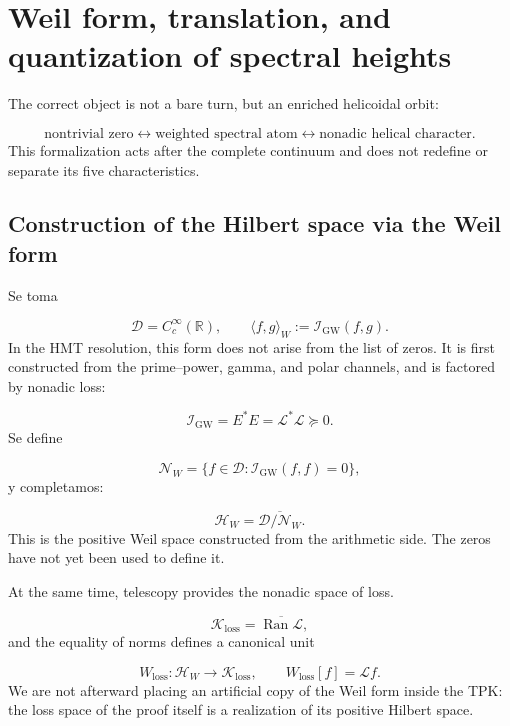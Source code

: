 \section{Weil form, translation, and quantization of spectral heights}
The correct object is not a bare turn, but an enriched helicoidal orbit:\par
\[
\boxed{
\text{nontrivial zero}
\longleftrightarrow
\text{weighted spectral atom}
\longleftrightarrow
\text{nonadic helical character}.
}
\]
This formalization acts after the complete continuum and does not redefine or separate its five characteristics.\par
{}
\subsection{Construction of the Hilbert space via the Weil form}
Se toma\par
\[
\mathcal D=C_c^\infty(\mathbb R),
\qquad
\langle f,g\rangle_W
:=
\mathscr I_{\mathrm{GW}}(f,g).
\]
In the HMT resolution, this form does not arise from the list of zeros. It is first constructed from the prime--power, gamma, and polar channels, and is factored by nonadic loss:\par
\[
\mathscr I_{\mathrm{GW}}
=
E^*E
=
\mathscr L^*\mathscr L
\succeq0.
\]
Se define\par
\[
\mathcal N_W
=
\{f\in\mathcal D:
\mathscr I_{\mathrm{GW}}(f,f)=0\},
\]
y completamos:\par
\[
\mathcal H_W
=
\overline{\mathcal D/\mathcal N_W}.
\]
This is the positive Weil space constructed from the arithmetic side. The zeros have not yet been used to define it.\par
At the same time, telescopy provides the nonadic space of loss.\par
\[
\mathcal K_{\mathrm{loss}}
=
\overline{\operatorname{Ran}\mathscr L},
\]
and the equality of norms defines a canonical unit\par
\[
W_{\mathrm{loss}}:
\mathcal H_W
\longrightarrow
\mathcal K_{\mathrm{loss}},
\qquad
W_{\mathrm{loss}}[f]=\mathscr Lf.
\]
We are not afterward placing an artificial copy of the Weil form inside the TPK: the loss space of the proof itself is a realization of its positive Hilbert space.\par
{}
